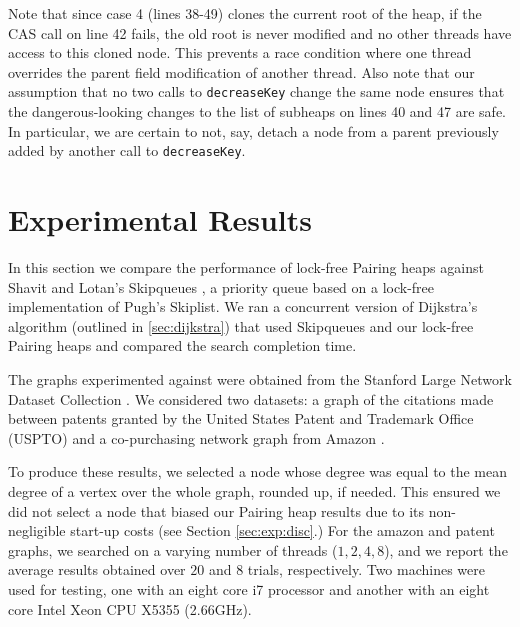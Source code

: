\documentclass{acm_proc_article-sp}
\begin{document}
Note that since case 4 (lines 38-49) clones the current root of the heap, if the CAS
call on line 42 fails, the old root is never modified and no other threads
have access to this cloned node. This prevents a race condition where one
thread overrides the parent field modification of another thread. Also
note that our assumption that no two calls to \texttt{decreaseKey} change
the same node ensures that the dangerous-looking changes to the
list of subheaps on lines 40 and 47 are safe. In particular, we are
certain to not, say, detach a node from a parent previously added by
another call to \texttt{decreaseKey}.



\section{Experimental Results}
\label{sec:exp}
In this section we compare the performance of lock-free Pairing heaps against
Shavit and Lotan's Skipqueues \cite{shavit00}, a priority queue based
on a lock-free implementation of Pugh's \cite{pugh90a} Skiplist.
We ran a concurrent version of Dijkstra's algorithm (outlined in 
\ref{sec:dijkstra}) that used Skipqueues and our lock-free Pairing heaps
and compared the search completion time.

The graphs experimented against were obtained from 
the Stanford Large Network Dataset Collection \cite{slndc}.
We considered two datasets: a graph of the citations made
between patents granted by the United States Patent and Trademark
Office (USPTO) \cite{leskovec05}
and a co-purchasing network graph from Amazon \cite{leskovec07}.

To produce these results, we selected a node whose degree
was equal to the mean degree of a vertex over the whole graph,
rounded up, if needed. This ensured we did not select a node
that biased our Pairing heap results due to its non-negligible 
start-up costs (see Section \ref{sec:exp:disc}.) For the amazon and patent graphs,
we searched on a varying number of threads ($1,2,4,8$), and
we report the average results obtained over $20$ and $8$ trials, respectively. 
Two machines were used for testing, one with an eight core i7 processor and another with an eight core Intel Xeon CPU           X5355 (2.66GHz). 
\end{document}
